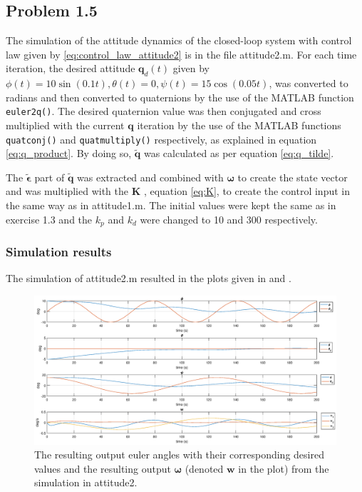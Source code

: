 

\subsection*{Problem 1.5}

The simulation of the attitude dynamics of the closed-loop system with control law given by \eqref{eq:control_law_attitude2} is in the file {\color{blue} attitude2.m}. For each time iteration,
the desired attitude $\mathbf{q}_d(t)$ given by $\phi(t) = 10\sin(0.1t), \theta(t) = 0, \psi(t) = 15\cos(0.05t)$, was converted to radians and then converted to quaternions by the use of the MATLAB function \texttt{euler2q()}. The desired quaternion value was then conjugated and cross multiplied with the current $\mathbf{q}$ iteration by the use of the MATLAB functions \texttt{quatconj()} and \texttt{quatmultiply()} respectively, as explained in equation \eqref{eq:q_product}. By doing so, $\mathbf{\tilde{q}}$ was calculated as per equation \eqref{eq:q_tilde}.

The $\tilde{\boldsymbol{\epsilon}}$ part of $\mathbf{\tilde{q}}$ was extracted and combined with $\boldsymbol{\omega}$ to create the state vector and was multiplied with the $\mathbf{K}$ , equation \eqref{eq:K}, to create the control input in the same way as in {\color{blue} attitude1.m}. The initial values were kept the same as in exercise 1.3 and the $k_p$ and $k_d$ were changed to 10 and 300 respectively. 

\subsubsection*{Simulation results}

The simulation  of  {\color{blue} attitude2.m} resulted in the plots given in  and .

\begin{figure}[htb]
	\centering
	\includegraphics[width=1.00\textwidth]{figures/2_euler.eps}
	\caption{The resulting output euler angles with their corresponding desired values and the resulting output $\boldsymbol{\omega}$ (denoted $\mathbf{w}$ in the plot) from the simulation in attitude2.}
\label{fig:sim_attitude2_euler}
\end{figure}

